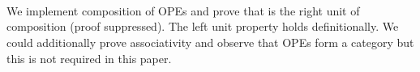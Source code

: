\documentclass[preliminary,copyright,creativecommons]{eptcs}
\newenvironment{code}{\verbatim}{\endverbatim}
\begin{document}
\begin{samepage}
\begin{code}\>  \AgdaSymbol{:} \AgdaSymbol{(}  \AgdaSymbol{:} \AgdaSymbol{)}   \<\\
\>[0]\<[2]\>[2] \<[8]\>[8]\AgdaSymbol{:} \AgdaSymbol{\}} \<[28]\>[28]   \<\\
\>[0]\<[2]\>[2] \<[8]\>[8]\AgdaSymbol{:}   \AgdaSymbol{\}}     \<[28]\>[28] \AgdaSymbol{(} \AgdaInductiveConstructor{,} \AgdaSymbol{)}  \<\\
\>[0]\<[2]\>[2] \<[8]\>[8]\AgdaSymbol{:}   \AgdaSymbol{\}}     \<[28]\>[28] \AgdaSymbol{(} \AgdaInductiveConstructor{,} \AgdaSymbol{)}  \AgdaSymbol{(} \AgdaInductiveConstructor{,} \AgdaSymbol{)}\<\end{code}
\end{samepage}

\noindent
We implement composition of OPEs and prove that  is the right
unit of composition (proof suppressed). The left unit property holds
definitionally. We could additionally prove associativity and observe
that OPEs form a category but this is not required in this paper.
\end{document}
